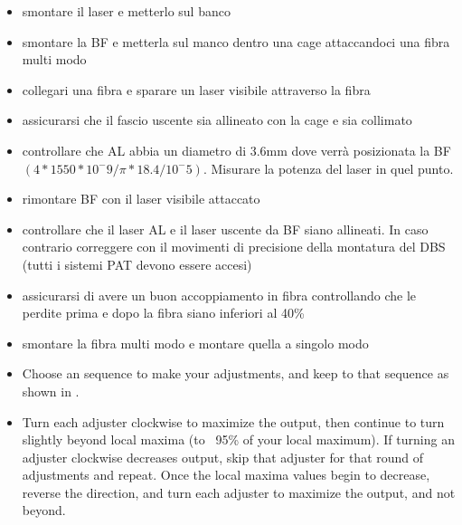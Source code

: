 \begin{itemize}
  \item smontare il laser e metterlo sul banco
  \item smontare la BF e metterla sul manco dentro una cage attaccandoci una fibra multi modo
  \item collegari una fibra e sparare un laser visibile attraverso la fibra
  \item assicurarsi che il fascio uscente sia allineato con la cage e sia collimato
  \item controllare che AL abbia un diametro di 3.6mm dove verrà posizionata la BF $(4 * 1550 * 10^-9 / \pi * 18.4 / 10^-5)$. Misurare la potenza del laser in quel punto.
  \item rimontare BF con il laser visibile attaccato
  \item controllare che il laser AL e il laser uscente da BF siano allineati. In caso contrario correggere con il movimenti di precisione della montatura del DBS (tutti i sistemi PAT devono essere accesi)
  \item assicurarsi di avere un buon accoppiamento in fibra controllando che le perdite prima e dopo la fibra siano inferiori al 40\%
\end{itemize}

\begin{itemize}
  \item smontare la fibra multi modo e montare quella a singolo modo
  \item Choose an sequence to make your adjustments, and keep to that sequence as shown in .
  \item Turn each adjuster clockwise to maximize the output, then continue to turn slightly beyond local maxima (to ~95\% of your local maximum). If turning an adjuster clockwise decreases output, skip that adjuster for that round of adjustments and repeat. Once the local maxima values begin to decrease, reverse the direction, and turn each adjuster to maximize the output, and not beyond.
\end{itemize}

